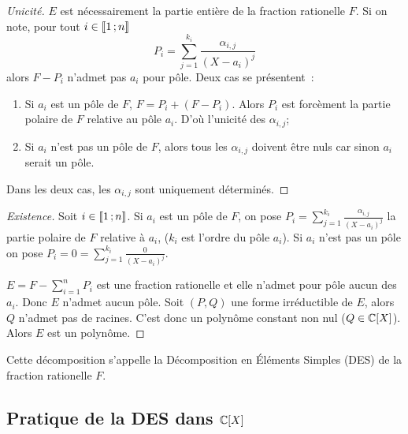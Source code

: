 \begin{proof}[Unicité]
  $E$ est nécessairement la partie entière de la fraction rationelle $F$. Si on note, pour tout $i \in \mathopen{\llbracket}1\mathclose{}\mathpunct{};n\mathclose{\rrbracket}$
  \begin{equation}
    P_i = \sum_{j=1}^{k_i} \frac{\alpha_{i,j}}{(X-a_i)^{j}}
  \end{equation}
  alors $F-P_i$ n'admet pas $a_i$ pour pôle. Deux cas se présentent~:
  \begin{enumerate}
  \item Si $a_i$ est un pôle de $F$, $F=P_i+(F-P_i)$. Alors $P_i$ est forcèment la partie polaire de $F$ relative au pôle $a_i$. D'où l'unicité des $\alpha_{i,j}$;
  \item Si $a_i$ n'est pas un pôle de $F$, alors tous les $\alpha_{i,j}$ doivent être nuls car sinon $a_i$ serait un pôle.
  \end{enumerate}
  Dans les deux cas, les $\alpha_{i,j}$ sont uniquement déterminés.
\end{proof}
\begin{proof}[Existence]
  Soit $i \in \mathopen{\llbracket}1\mathclose{}\mathpunct{};n\mathclose{\rrbracket}$. Si $a_i$ est un pôle de $F$, on pose $P_i = \sum_{j=1}^{k_i} \frac{\alpha_{i,j}}{(X-a_i)^{j}}$ la partie polaire de $F$ relative à $a_i$, ($k_i$ est l'ordre du pôle $a_i$). Si $a_i$ n'est pas un pôle on pose $P_i=0=\sum_{j=1}^{k_i} \frac{0}{(X-a_i)^{j}}$.

  $E=F-\sum_{i=1}^n P_i$ est une fraction rationelle et elle n'admet pour pôle aucun des $a_i$. Donc $E$ n'admet aucun pôle. Soit $(P,Q)$ une forme irréductible de $E$, alors $Q$ n'admet pas de racines. C'est donc un polynôme constant non nul ($Q \in \mathbb{C}[X]$). Alors $E$ est un polynôme.
\end{proof}

Cette décomposition s'appelle la Décomposition en Éléments Simples (DES) de la fraction rationelle $F$.

\subsection{Pratique de la DES dans $\mathbb{C}[X]$}

